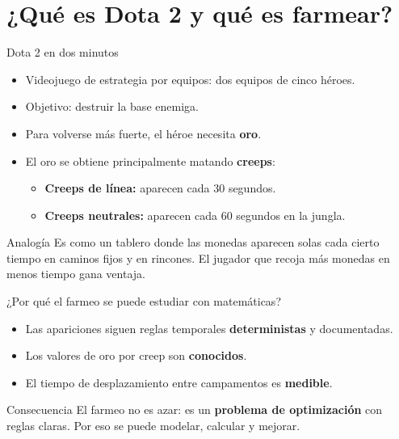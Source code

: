 \section{¿Qué es Dota 2 y qué es farmear?}

\begin{frame}{Dota 2 en dos minutos}
  \begin{itemize}
    \item Videojuego de estrategia por equipos: dos equipos de cinco héroes.
    \item Objetivo: destruir la base enemiga.
    \item Para volverse más fuerte, el héroe necesita \textbf{oro}.
    \item El oro se obtiene principalmente matando \textbf{creeps}:
      \begin{itemize}
        \item \textbf{Creeps de línea:} aparecen cada 30 segundos.
        \item \textbf{Creeps neutrales:} aparecen cada 60 segundos en la jungla.
      \end{itemize}
  \end{itemize}
  \vspace{0.5em}
  \begin{block}{Analogía}
    Es como un tablero donde las monedas aparecen solas cada cierto tiempo en caminos fijos y en rincones. El jugador que recoja más monedas en menos tiempo gana ventaja.
  \end{block}
\end{frame}

\begin{frame}{¿Por qué el farmeo se puede estudiar con matemáticas?}
  \begin{itemize}
    \item Las apariciones siguen reglas temporales \textbf{deterministas} y documentadas.
    \item Los valores de oro por creep son \textbf{conocidos}.
    \item El tiempo de desplazamiento entre campamentos es \textbf{medible}.
  \end{itemize}
  \vspace{0.8em}
  \begin{alertblock}{Consecuencia}
    El farmeo no es azar: es un \textbf{problema de optimización} con reglas claras. Por eso se puede modelar, calcular y mejorar.
  \end{alertblock}
\end{frame}